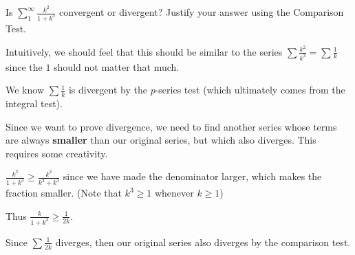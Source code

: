 \documentclass{ximera}
\begin{document}
\begin{question}
Is $\sum_1^\infty \frac{k^2}{1+k^3}$ convergent or divergent?  Justify your answer using the Comparison Test.

\begin{multipleChoice}	
\end{multipleChoice}

\begin{hint}
	Intuitively, we should feel that this should be similar to the series $\sum \frac{k^2}{k^3} = \sum \frac{1}{k}$ since the $1$ should not matter that much.
	
	We know $\sum \frac{1}{k}$ is divergent by the $p$-series test (which ultimately comes from the integral test).
	
	Since we want to prove divergence, we need to find another series whose terms are always \textbf{smaller} than our original series, but which also diverges.  This requires some creativity. 
\end{hint}

\begin{hint}
	 $\frac{k^2}{1+k^3} \geq \frac{k^2}{k^3+k^3}$ since we have made the denominator larger, which makes the fraction smaller. (Note that $k^3 \geq 1$ whenever $k \geq 1$)
	 
	 Thus $\frac{k}{1+k^3} \geq \frac{1}{2k}$.
	 
	 Since $\sum \frac{1}{2k}$ diverges, then our original series also diverges by the comparison test.
\end{hint}

\end{question}
\end{document}
